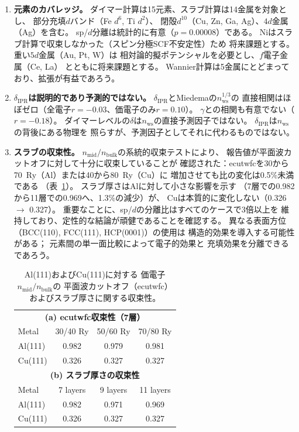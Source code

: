 \documentclass[twocolumn,showpacs,preprintnumbers,amsmath,amssymb,prb]{revtex4-2}
\begin{document}
\begin{enumerate}
  \item \textbf{元素のカバレッジ。}
    ダイマー計算は15元素、スラブ計算は14金属を対象とし、
    部分充填$d$バンド（Fe $d^6$, Ti $d^2$）、
    閉殻$d^{10}$（Cu, Zn, Ga, Ag）、$4d$金属（Ag）を含む。
    sp/$d$分離は統計的に有意（$p = 0.00008$）である。
    Niはスラブ計算で収束しなかった（スピン分極SCF不安定性）ため
    将来課題とする。重い$5d$金属（Au, Pt, W）は
    相対論的擬ポテンシャルを必要とし、$f$電子金属（Ce, La）
    とともに将来課題とする。
    Wannier計算は5金属にとどまっており、拡張が有益であろう。

  \item \textbf{$\delta_\mathrm{IPR}$は説明的であり予測的ではない。}
    $\delta_\mathrm{IPR}$とMiedemaの$n_\mathrm{ws}^{1/3}$の
    直接相関はほぼゼロ（全電子$r = -0.03$、価電子のみ$r = 0.10$）。
    $\gamma$との相関も有意でない（$r = -0.18$）。
    ダイマーレベルの$\delta$は$n_\mathrm{ws}$の直接予測因子ではない。
    $\delta_\mathrm{IPR}$は$n_\mathrm{ws}$の背後にある物理を
    照らすが、予測因子としてそれに代わるものではない。

  \item \textbf{スラブの収束性。}
    $n_\mathrm{mid}/n_\mathrm{bulk}$の系統的収束テストにより、
    報告値が平面波カットオフに対して十分に収束していることが
    確認された：ecutwfcを30から70~Ry（Al）または40から80~Ry（Cu）に
    増加させても比の変化は0.5\%未満である
    （表~\ref{tab:convergence}）。
    スラブ厚さはAlに対して小さな影響を示す
    （7層での0.982から11層での0.969へ、1.3\%の減少）が、
    Cuは本質的に変化しない（0.326 $\to$ 0.327）。
    重要なことに、sp/$d$の分離比はすべてのケースで3倍以上を
    維持しており、定性的な結論が頑健であることを確認する。
    異なる表面方位（BCC(110), FCC(111), HCP(0001)）の使用は
    構造的効果を導入する可能性がある；
    元素間の単一面比較によって電子的効果と
    充填効果を分離できるであろう。

\begin{table}[htb]
  \centering
  \caption{Al(111)およびCu(111)に対する
    価電子$n_\mathrm{mid}/n_\mathrm{bulk}$の
    平面波カットオフ（ecutwfc）およびスラブ厚さに関する収束性。}
  \label{tab:convergence}
  \begin{ruledtabular}
  \begin{tabular}{lccc}
    \multicolumn{4}{c}{\textbf{(a) ecutwfc収束性（7層）}} \\
    Metal & 30/40 Ry & 50/60 Ry & 70/80 Ry \\
    \hline
    Al(111) & 0.982 & 0.979 & 0.981 \\
    Cu(111) & 0.326 & 0.327 & 0.327 \\[6pt]
    \multicolumn{4}{c}{\textbf{(b) スラブ厚さの収束性}} \\
    Metal & 7 layers & 9 layers & 11 layers \\
    \hline
    Al(111) & 0.982 & 0.971 & 0.969 \\
    Cu(111) & 0.326 & 0.327 & 0.327 \\
  \end{tabular}
  \end{ruledtabular}
\end{table}


\end{enumerate}
\end{document}
